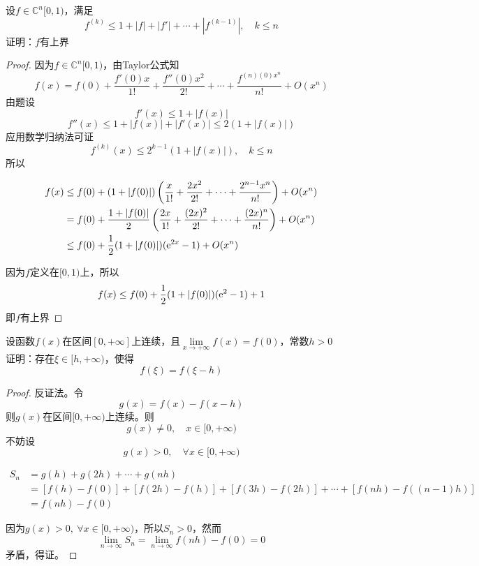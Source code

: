 \begin{proposition}
    
    设$f \in \mathbb{C}^{n}[0,1)$，满足
    $$f^{(k)} \leq 1 + |f| + |f'| + \cdots + |f^{(k - 1)}|,\quad k \leq n$$
    证明：$f$有上界

\end{proposition}

\begin{proof}
    因为$f \in \mathbb{C}^{n}[0,1)$，由\textup{Taylor}公式知
    $$f(x) = f(0) + \dfrac{f'(0)x}{1!} + \dfrac{f''(0)x^2}{2!} + \cdots + \dfrac{f^{(n)(0)x^n}}{n!} + O(x^n)$$
    由题设
    $$f'(x) \leq 1 + |f(x)|$$
    $$f''(x) \leq 1 + |f(x)| + |f'(x)| \leq 2(1 + |f(x)|)$$
    应用数学归纳法可证
    $$f^{(k)}(x) \leq 2^{k - 1}(1 + |f(x)|), \quad k \leq n$$
    所以

    \begin{align*}
        f(x) & \leq f(0) + (1 + |f(0)|)\left(\dfrac{x}{1!} + \dfrac{2x^2}{2!} + \cdots + \dfrac{2^{n - 1}x^n}{n!}\right) + O(x^n) \\
        & = f(0) + \dfrac{1 + |f(0)|}{2}\left(\dfrac{2x}{1!} + \dfrac{(2x)^2}{2!} + \cdots + \dfrac{(2x)^{n}}{n!}\right) + O(x^n) \\
        & \leq f(0) + \dfrac{1}{2}(1 + |f(0)|)(\mathrm{e}^{2x} - 1) + O(x^n)
    \end{align*}

    因为$f$定义在$[0,1)$上，所以
    $$f(x) \leq f(0) + \dfrac{1}{2}(1 + |f(0)|)(\mathrm{e}^2 - 1) + 1$$
    即$f$有上界
    
\end{proof}

\begin{proposition}
    设函数$f(x)$在区间$[0, +\infty]$上连续，且$\lim\limits_{x \to +\infty}{f(x)} = f(0)$，常数$h > 0$\\
    证明：存在$\xi \in [h, +\infty)$，使得
    $$f(\xi) = f(\xi - h)$$
\end{proposition}

\begin{proof}

    反证法。令
    $$g(x) = f(x) - f(x - h)$$
    则$g(x)$在区间$[0,+\infty)$上连续。则
    $$g(x) \neq 0, \quad x \in [0,+\infty)$$
    不妨设
    $$g(x) > 0, \quad \forall x \in [0,+\infty)$$
    
    \begin{align*}
        S_n & = g(h) + g(2h) + \cdots + g(nh) \\
        & = [f(h) - f(0)] + [f(2h) - f(h)] + [f(3h) - f(2h)] + \cdots + [f(nh) - f((n - 1)h)] \\
        & = f(nh) - f(0)
    \end{align*}
  
    因为$g(x) > 0, \ \forall x \in [0,+\infty)$，所以$S_n > 0$，然而
    $$\lim\limits_{n \to \infty}{S_n} = \lim\limits_{n \to \infty}{f(nh)} - f(0) = 0$$
    矛盾，得证。

\end{proof}

